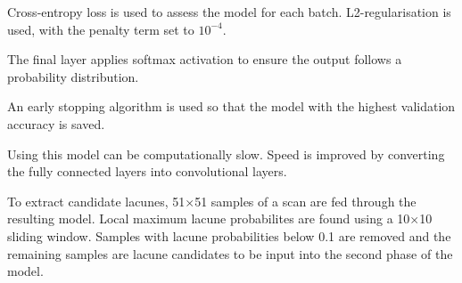 Cross-entropy loss is used to assess the model for each batch. L2-regularisation is used, with the penalty term set to $10^{-4}$. 

The final layer applies softmax activation to ensure the output follows a probability distribution.

An early stopping algorithm is used so that the model with the highest validation accuracy is saved.

Using this model can be computationally slow. Speed is improved by converting the fully connected layers into convolutional layers.

To extract candidate lacunes, 51$\times$51 samples of a scan are fed through the resulting model. Local maximum lacune probabilites are found using a 10$\times$10 sliding window. Samples with lacune probabilities below 0.1 are removed and the remaining samples are lacune candidates to be input into the second phase of the model.


%
%
%
%
%
%
%
%
%
%
%
%
%
%
%
%
%
%
%

